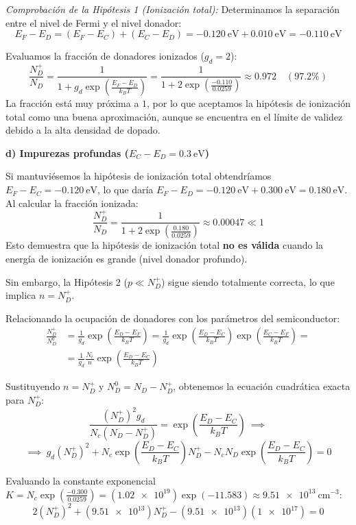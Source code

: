 \begin{problema}
\textit{Comprobación de la Hipótesis 1 (Ionización total):}
Determinamos la separación entre el nivel de Fermi y el nivel donador:
\[
E_F - E_D = (E_F - E_C) + (E_C - E_D) = \SI{-0.120}{\eV} + \SI{0.010}{\eV} = \SI{-0.110}{\eV}
\]

Evaluamos la fracción de donadores ionizados ($g_d = 2$):
\[
\frac{N_D^+}{N_D} = \frac{1}{1 + g_d \exp\left( \frac{E_F - E_D}{k_B T} \right)} = \frac{1}{1 + 2 \exp\left( \frac{-0.110}{0.0259} \right)} \approx 0.972 \quad (97.2\%)
\]
La fracción está muy próxima a $1$, por lo que aceptamos la hipótesis de ionización total como una buena aproximación, aunque se encuentra en el límite de validez debido a la alta densidad de dopado.

\textbf{d) Impurezas profundas ($E_C - E_D = \SI{0.3}{\eV}$)}

Si mantuviésemos la hipótesis de ionización total obtendríamos $E_F - E_C = \SI{-0.120}{\eV}$, lo que daría $E_F - E_D = \SI{-0.120}{\eV} + \SI{0.300}{\eV} = \SI{+0.180}{\eV}$. Al calcular la fracción ionizada:
\[
\frac{N_D^+}{N_D} = \frac{1}{1 + 2 \exp\left( \frac{0.180}{0.0259} \right)} \approx \num{0.00047} \ll 1
\]
Esto demuestra que la hipótesis de ionización total \textbf{no es válida} cuando la energía de ionización es grande (nivel donador profundo).

Sin embargo, la Hipótesis 2 ($p \ll N_D^+$) sigue siendo totalmente correcta, lo que implica $n = N_D^+$.

Relacionando la ocupación de donadores con los parámetros del semiconductor:
\[
\begin{array}{rl}
    \displaystyle \frac{N_D^+}{N_D^0} & \displaystyle = \frac{1}{g_d} \exp\left( \frac{E_D - E_F}{k_B T} \right) = \frac{1}{g_d} \exp\left( \frac{E_D - E_C}{k_B T} \right) \exp\left( \frac{E_C - E_F}{k_B T} \right) = \\[8pt]
     & \displaystyle =\frac{1}{g_d} \frac{N_c}{n} \exp\left( \frac{E_D - E_C}{k_B T} \right)
\end{array}
\]

Sustituyendo $n = N_D^+$ y $N_D^0 = N_D - N_D^+$, obtenemos la ecuación cuadrática exacta para $N_D^+$:
\[
\frac{(N_D^+)^2 g_d}{N_c (N_D - N_D^+)} = \exp\left( \frac{E_D - E_C}{k_B T} \right) \:\implies
\]
\[
\implies \: g_d (N_D^+)^2 + N_c \exp\left(\frac{E_D - E_C}{k_B T}\right) N_D^+ - N_c N_D \exp\left(\frac{E_D - E_C}{k_B T}\right) = 0
\]

Evaluando la constante exponencial $K = N_c \exp\left( \frac{-0.300}{0.0259} \right) = (\num{1.02e19}) \exp(-11.583) \approx \SI{9.51e13}{\cm^{-3}}$:
\[
2 (N_D^+)^2 + (\num{9.51e13}) N_D^+ - (\num{9.51e13}) (\num{1e17}) = 0
\]


\end{problema}
